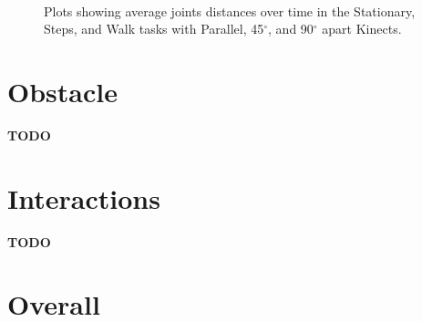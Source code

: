 \begin{figure}[!h]
{  } \\

  \caption{Plots showing average joints distances over time in the Stationary, Steps, and Walk tasks with Parallel, 45$^{\circ}$, and 90$^{\circ}$ apart Kinects.}

  \label{fig:results_three_joints_over_time}
\end{figure}

\section{Obstacle}
\label{sec:results_obstacle}

\textbf{TODO}

\section{Interactions}
\label{sec:results_interactions}

\textbf{TODO}

\section{Overall}
\label{sec:results_overall}

